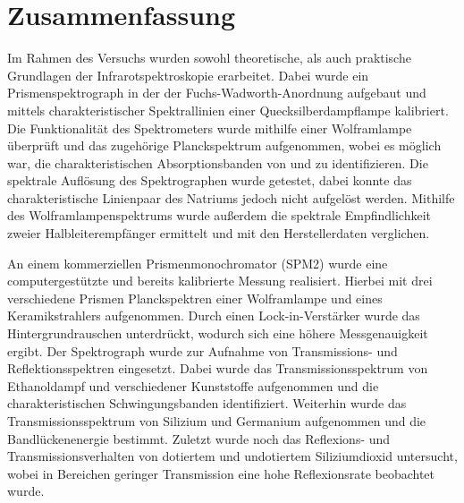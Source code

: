 \documentclass[a4paper,twoside,final]{article}
\begin{document}
\section{Zusammenfassung}
Im Rahmen des Versuchs wurden sowohl theoretische, als auch praktische Grundlagen der Infrarotspektroskopie erarbeitet. Dabei wurde ein Prismenspektrograph in der der Fuchs-Wadworth-Anordnung aufgebaut und mittels charakteristischer Spektrallinien einer Quecksilberdampflampe kalibriert. Die Funktionalität des Spektrometers wurde mithilfe einer Wolframlampe überprüft und das zugehörige Planckspektrum aufgenommen, wobei es möglich war, die charakteristischen Absorptionsbanden von  und  zu identifizieren. Die spektrale Auflösung des Spektrographen wurde getestet, dabei konnte das charakteristische Linienpaar des Natriums jedoch nicht aufgelöst werden. Mithilfe des Wolframlampenspektrums wurde außerdem die spektrale Empfindlichkeit zweier Halbleiterempfänger ermittelt und mit den Herstellerdaten verglichen.

An einem kommerziellen Prismenmonochromator (SPM2) wurde eine computergestützte und bereits kalibrierte Messung realisiert. Hierbei mit drei verschiedene Prismen Planckspektren einer Wolframlampe und eines Keramikstrahlers aufgenommen. Durch einen Lock-in-Verstärker wurde das Hintergrundrauschen unterdrückt, wodurch sich eine höhere Messgenauigkeit ergibt. Der Spektrograph wurde zur Aufnahme von Transmissions- und Reflektionsspektren eingesetzt. Dabei wurde das Transmissionsspektrum von Ethanoldampf und verschiedener Kunststoffe aufgenommen und die charakteristischen Schwingungsbanden identifiziert. Weiterhin wurde das Transmissionsspektrum von Silizium und Germanium aufgenommen und die Bandlückenenergie bestimmt. Zuletzt wurde noch das Reflexions- und Transmissionsverhalten von dotiertem und undotiertem Siliziumdioxid untersucht, wobei in Bereichen geringer Transmission eine hohe Reflexionsrate beobachtet wurde.

{}

\end{document}
